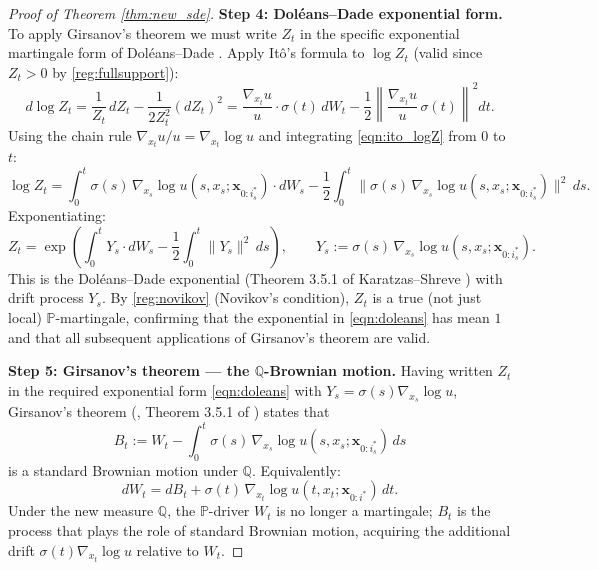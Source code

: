 \documentclass{article}
\newcommand{\PP}{\mathbb{P}}
\newcommand{\QQ}{\mathbb{Q}}
\begin{document}
\begin{proof}[Proof of Theorem \ref{thm:new_sde}]
\noindent\textbf{Step 4: Dol\'eans--Dade exponential form.}
To apply Girsanov's theorem \cite{girsanov1960transforming} we must write $Z_t$ in the specific exponential
martingale form of Dol\'eans--Dade \cite{doleans1970quelques}.  Apply It\^o's formula to $\log Z_t$
(valid since $Z_t>0$ by \ref{reg:fullsupport}):
\begin{equation}\label{eqn:ito_logZ}
  d\log Z_t
  = \frac{1}{Z_t}\,dZ_t - \frac{1}{2Z_t^2}(dZ_t)^2
  = \frac{\nabla_{x_t}u}{u}\cdot\sigma(t)\,dW_t
    - \frac{1}{2}\left\|\frac{\nabla_{x_t}u}{u}\,\sigma(t)\right\|^2 dt.
\end{equation}
Using the chain rule $\nabla_{x_t}u/u = \nabla_{x_t}\log u$ and integrating
\eqref{eqn:ito_logZ} from $0$ to $t$:
\begin{equation}\label{eqn:logZ}
  \log Z_t
  = \int_0^t \sigma(s)\,\nabla_{x_s}\log u(s,x_s;\mathbf{x}_{0:i^*_s})\cdot dW_s
  - \frac{1}{2}\int_0^t \|\sigma(s)\,\nabla_{x_s}\log u(s,x_s;\mathbf{x}_{0:i^*_s})\|^2\,ds.
\end{equation}
Exponentiating:
\begin{equation}\label{eqn:doleans}
  Z_t = \exp\left(
    \int_0^t Y_s\cdot dW_s
    - \frac{1}{2}\int_0^t\|Y_s\|^2\,ds
  \right),
  \qquad Y_s := \sigma(s)\,\nabla_{x_s}\log u(s,x_s;\mathbf{x}_{0:i^*_s}).
\end{equation}
This is the Dol\'eans--Dade exponential (Theorem 3.5.1 of Karatzas--Shreve \cite{karatzas2014brownian})
with drift process $Y_s$.  By \ref{reg:novikov} (Novikov's condition), $Z_t$
is a true (not just local) $\PP$-martingale, confirming that the exponential
in \eqref{eqn:doleans} has mean $1$ and that all subsequent applications of
Girsanov's theorem are valid.


\noindent\textbf{Step 5: Girsanov's theorem — the $\QQ$-Brownian motion.}
Having written $Z_t$ in the required exponential form \eqref{eqn:doleans}
with $Y_s = \sigma(s)\nabla_{x_s}\log u$, Girsanov's theorem (\cite{girsanov1960transforming},
Theorem 3.5.1 of \cite{karatzas2014brownian}) states that
\begin{equation}\label{eqn:BQ}
  B_t := W_t - \int_0^t \sigma(s)\,\nabla_{x_s}\log u(s,x_s;\mathbf{x}_{0:i^*_s})\,ds
\end{equation}
is a standard Brownian motion under $\QQ$.  Equivalently:
\begin{equation}\label{eqn:dBrel}
  dW_t = dB_t + \sigma(t)\,\nabla_{x_t}\log u(t,x_t;\mathbf{x}_{0:i^*})\,dt.
\end{equation}
Under the new measure $\QQ$, the $\PP$-driver $W_t$ is no longer a martingale; $B_t$ is the
process that plays the role of standard Brownian motion, acquiring the additional drift
$\sigma(t)\nabla_{x_t}\log u$ relative to $W_t$.


\end{proof}
\end{document}
